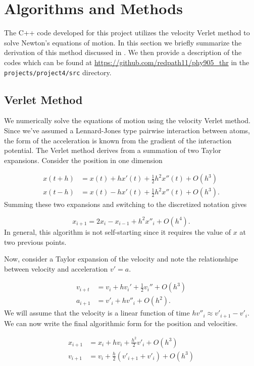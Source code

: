 \documentclass[10pt,showpacs,preprintnumbers,footinbib,amsmath,amssymb,aps,prl,twocolumn,groupedaddress,superscriptaddress,showkeys]{revtex4-1}
\begin{document}
\section*{Algorithms and Methods}

The C++ code developed for this project utilizes the velocity
Verlet method to solve Newton's equations of motion. In this section we briefly
summarize the derivation of this method discussed in \citet{Morten}. We
then provide a description of the codes which can be
found at \url{https://github.com/redpath11/phy905_thr} in the
\texttt{projects/project4/src} directory.

\subsection*{Verlet Method}

We numerically solve the equations of motion using the velocity
Verlet method. Since we've assumed a Lennard-Jones type
pairwise interaction between atoms, the form of the acceleration
is known from the gradient of the interaction potential. The Verlet
method derives from a summation of two Taylor expansions. Consider
the position in one dimension

\begin{align*}
	x(t+h) &= x(t) + h x'(t) + \frac{1}{2} h^2  x''(t) + O(h^3)\\
	x(t-h) &= x(t)  - h x'(t) + \frac{1}{2} h^2  x''(t) + O(h^3).
\end{align*}
Summing these two expansions and switching to the discretized
notation gives

\begin{equation*}
	x_{i+1} = 2 x_i - x_{i-1} + h^2 x''_i + O(h^4).
\end{equation*}
In general, this algorithm is not self-starting since it requires the
value of $x$ at two previous points.

Now, consider a Taylor expansion of the velocity and note the
relationshipe between velocity and acceleration $v' = a$.

\begin{align*}
	v_{i+t} &= v_i + h v_i ' + \frac{1}{2} v_i '' + O(h^3)\\
	a_{i+1} &= v'_i + h v''_i + O(h^2).
\end{align*}
We will assume that the velocity is a linear function of time
$hv''_i \approx v'_{i+1} - v'_i$. We can now write the final
algorithmic form for the position and velocities.

\begin{align}
	x_{i+1} &= x_i + hv_i + \frac{h^2}{2} v'_i + O(h^3)\\
	v_{i+1} &= v_i + \frac{h}{2}(v'_{i+1} + v'_i) + O(h^3)
\label{eq:Verlet}
\end{align}
\end{document}
